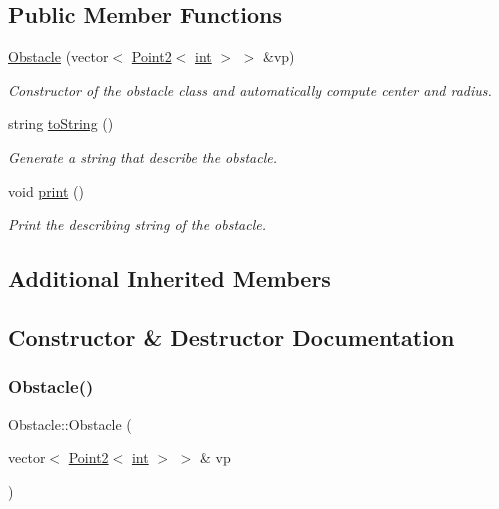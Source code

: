 \subsection*{Public Member Functions}
\begin{DoxyCompactItemize}
\item 
\mbox{\hyperlink{class_obstacle_a1c9e272c9689ec5c110d05b95ea3ac91}{Obstacle}} (vector$<$ \mbox{\hyperlink{class_point2}{Point2}}$<$ \mbox{\hyperlink{draw_8hh_aa620a13339ac3a1177c86edc549fda9b}{int}} $>$ $>$ \&vp)
\begin{DoxyCompactList}\small\item\em Constructor of the obstacle class and automatically compute center and radius. \end{DoxyCompactList}\item 
string \mbox{\hyperlink{class_obstacle_aa2ed0727bded2b8a0265157fd298219e}{to\+String}} ()
\begin{DoxyCompactList}\small\item\em Generate a string that describe the obstacle. \end{DoxyCompactList}\item 
void \mbox{\hyperlink{class_obstacle_a5484b8b93564f029d1e688b477be7d1d}{print}} ()
\begin{DoxyCompactList}\small\item\em Print the describing string of the obstacle. \end{DoxyCompactList}\end{DoxyCompactItemize}
\subsection*{Additional Inherited Members}


\subsection{Constructor \& Destructor Documentation}
\mbox{\label{class_obstacle_a1c9e272c9689ec5c110d05b95ea3ac91}} 
\subsubsection{\texorpdfstring{Obstacle()}{Obstacle()}}
{\footnotesize\ttfamily Obstacle\+::\+Obstacle (\begin{DoxyParamCaption}\item[{vector$<$ \mbox{\hyperlink{class_point2}{Point2}}$<$ \mbox{\hyperlink{draw_8hh_aa620a13339ac3a1177c86edc549fda9b}{int}} $>$ $>$ \&}]{vp }\end{DoxyParamCaption})}



